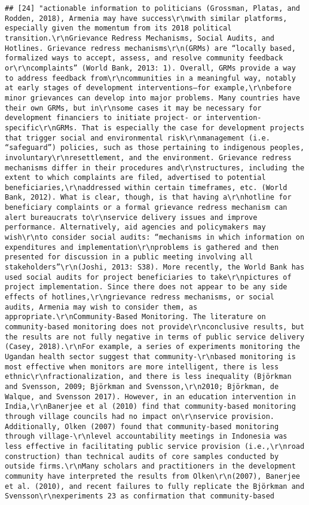 \documentclass[
]{article}
\begin{document}
\begin{verbatim}
## [24] "actionable information to politicians (Grossman, Platas, and Rodden, 2018), Armenia may have success\r\nwith similar platforms, especially given the momentum from its 2018 political transition.\r\nGrievance Redress Mechanisms, Social Audits, and Hotlines. Grievance redress mechanisms\r\n(GRMs) are “locally based, formalized ways to accept, assess, and resolve community feedback or\r\ncomplaints” (World Bank, 2013: 1). Overall, GRMs provide a way to address feedback from\r\ncommunities in a meaningful way, notably at early stages of development interventions—for example,\r\nbefore minor grievances can develop into major problems. Many countries have their own GRMs, but in\r\nsome cases it may be necessary for development financiers to initiate project- or intervention-specific\r\nGRMs. That is especially the case for development projects that trigger social and environmental risk\r\nmanagement (i.e. “safeguard”) policies, such as those pertaining to indigenous peoples, involuntary\r\nresettlement, and the environment. Grievance redress mechanisms differ in their procedures and\r\nstructures, including the extent to which complaints are filed, advertised to potential beneficiaries,\r\naddressed within certain timeframes, etc. (World Bank, 2012). What is clear, though, is that having a\r\nhotline for beneficiary complaints or a formal grievance redress mechanism can alert bureaucrats to\r\nservice delivery issues and improve performance. Alternatively, aid agencies and policymakers may wish\r\nto consider social audits: “mechanisms in which information on expenditures and implementation\r\nproblems is gathered and then presented for discussion in a public meeting involving all stakeholders”\r\n(Joshi, 2013: S38). More recently, the World Bank has used social audits for project beneficiaries to take\r\npictures of project implementation. Since there does not appear to be any side effects of hotlines,\r\ngrievance redress mechanisms, or social audits, Armenia may wish to consider them, as appropriate.\r\nCommunity-Based Monitoring. The literature on community-based monitoring does not provide\r\nconclusive results, but the results are not fully negative in terms of public service delivery (Casey, 2018).\r\nFor example, a series of experiments monitoring the Ugandan health sector suggest that community-\r\nbased monitoring is most effective when monitors are more intelligent, there is less ethnic\r\nfractionalization, and there is less inequality (Björkman and Svensson, 2009; Björkman and Svensson,\r\n2010; Björkman, de Walque, and Svensson 2017). However, in an education intervention in India,\r\nBanerjee et al (2010) find that community-based monitoring through village councils had no impact on\r\nservice provision. Additionally, Olken (2007) found that community-based monitoring through village-\r\nlevel accountability meetings in Indonesia was less effective in facilitating public service provision (i.e.,\r\nroad construction) than technical audits of core samples conducted by outside firms.\r\nMany scholars and practitioners in the development community have interpreted the results from Olken\r\n(2007), Banerjee et al. (2010), and recent failures to fully replicate the Björkman and Svensson\r\nexperiments 23 as confirmation that community-based 
\end{verbatim}
\end{document}
